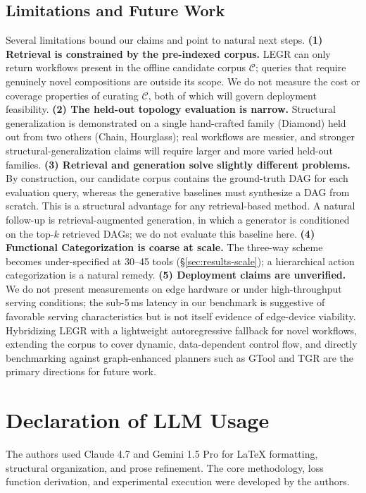 \documentclass{article}
\begin{document}
\subsection*{Limitations and Future Work}
Several limitations bound our claims and point to natural next steps.
\textbf{(1) Retrieval is constrained by the pre-indexed corpus.} LEGR can only return workflows present in the offline candidate corpus $\mathcal{C}$; queries that require genuinely novel compositions are outside its scope. We do not measure the cost or coverage properties of curating $\mathcal{C}$, both of which will govern deployment feasibility.
\textbf{(2) The held-out topology evaluation is narrow.} Structural generalization is demonstrated on a single hand-crafted family (Diamond) held out from two others (Chain, Hourglass); real workflows are messier, and stronger structural-generalization claims will require larger and more varied held-out families.
\textbf{(3) Retrieval and generation solve slightly different problems.} By construction, our candidate corpus contains the ground-truth DAG for each evaluation query, whereas the generative baselines must synthesize a DAG from scratch. This is a structural advantage for any retrieval-based method. A natural follow-up is retrieval-augmented generation, in which a generator is conditioned on the top-$k$ retrieved DAGs; we do not evaluate this baseline here.
\textbf{(4) Functional Categorization is coarse at scale.} The three-way scheme becomes under-specified at 30--45 tools (\S\ref{sec:results-scale}); a hierarchical action categorization is a natural remedy.
\textbf{(5) Deployment claims are unverified.} We do not present measurements on edge hardware or under high-throughput serving conditions; the sub-5\,ms latency in our benchmark is suggestive of favorable serving characteristics but is not itself evidence of edge-device viability.
Hybridizing LEGR with a lightweight autoregressive fallback for novel workflows, extending the corpus to cover dynamic, data-dependent control flow, and directly benchmarking against graph-enhanced planners such as GTool and TGR are the primary directions for future work.

\section*{Declaration of LLM Usage}
The authors used Claude 4.7 and Gemini 1.5 Pro for LaTeX formatting, structural organization, and prose refinement. The core methodology, loss function derivation, and experimental execution were developed by the authors.
\end{document}
